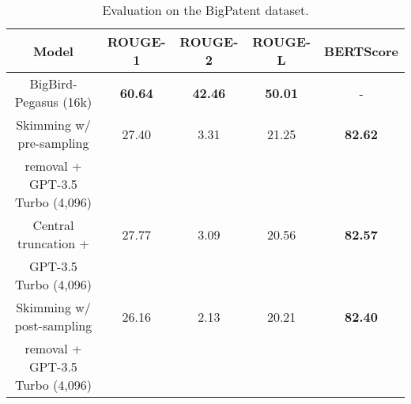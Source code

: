 		\begin{frame}

			\begin{table}[!ht]
				\centering
				\tiny
			
				\begin{tabular}{c c c c c}
					\hline
					Model & ROUGE-1 & ROUGE-2 & ROUGE-L & BERTScore \\
					\hline
					BigBird-Pegasus (16k) & \textbf{60.64} & \textbf{42.46} & \textbf{50.01} & - \\
					\hline
					Skimming w/ pre-sampling & 27.40 & 3.31 & 21.25 & \textbf{82.62} \\
					removal + GPT-3.5 Turbo (4,096) & & & & \\
					Central truncation + & 27.77 & 3.09 & 20.56 & \textbf{82.57} \\
					GPT-3.5 Turbo (4,096) & & & & \\
					Skimming w/ post-sampling & 26.16 & 2.13 & 20.21 & \textbf{82.40} \\
					removal + GPT-3.5 Turbo (4,096) & & & & \\
					\hline
				\end{tabular}
			
				\caption{Evaluation on the BigPatent dataset.}
			\end{table}

		\end{frame}
